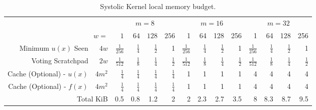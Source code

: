 \documentclass[11pt]{article}       %
\begin{document}
\begin{table}
	\centering
	\begin{tabular}{|r r|r|r|r|r|r|r|r|r|r|r|r|r|}
		\cline{3-14}
		\multicolumn{2}{c|}{} & \multicolumn{4}{c|}{$m=8$}                       & \multicolumn{4}{c|}{$m=16$}       & \multicolumn{4}{c|}{$m=32$}     \\ \cline{3-14} 
		\multicolumn{2}{r|}{$w=$} 			& $1$       		& $64$   & $128$    & $256$    & 1           & 64    & 128  & 256  & 1           & 64    & 128 & 256 \\ \hline
Minimum $u(x)$ Seen       & $4w$	&$\frac{1}{256}$	&$\frac{1}{4}$	&$\frac{1}{2}$	&1	&$\frac{1}{256}$	&$\frac{1}{4}$	&$\frac{1}{2}$	&1	&$\frac{1}{256}$	&$\frac{1}{4}$	&$\frac{1}{2}$	&1\\ \hline
Voting Scratchpad         & $2w$	&$\frac{1}{512}$	&$\frac{1}{8}$	&$\frac{1}{4}$	&$\frac{1}{2}$	&$\frac{1}{512}$	&$\frac{1}{8}$	&$\frac{1}{4}$	&$\frac{1}{2}$	&$\frac{1}{512}$	&$\frac{1}{8}$	&$\frac{1}{4}$	&$\frac{1}{2}$\\ \hline
Cache (Optional) - $u(x)$ & $4m^2$	&$\frac{1}{4}$	&$\frac{1}{4}$	&$\frac{1}{4}$	&$\frac{1}{4}$	&1	&1	&1	&1	&4	&4	&4	&4\\ \hline
Cache (Optional) - $f(x)$ & $4m^2$	&$\frac{1}{4}$	&$\frac{1}{4}$	&$\frac{1}{4}$	&$\frac{1}{4}$	&1	&1	&1	&1	&4	&4	&4	&4\\ \hline
\multicolumn{2}{|r|}{Total KiB}	&0.5	&0.8	&1.2	&2	&2	&2.3	&2.7	&3.5	&8	&8.3	&8.7	&9.5\\ \hline
	\end{tabular}
	\caption{Systolic Kernel local memory budget.\footnotemark }
	\label{tab:kernel_mem_budget_systolic}
\end{table}

\end{document}
